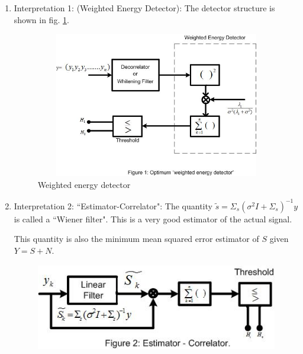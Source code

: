 \documentclass[a4paper,english,12pt]{article}
\begin{document}
\begin{enumerate}
\item Interpretation 1: (Weighted Energy Detector): The detector structure is shown in fig. \ref{fig:detstr1}.
\begin{figure}[!h]
\centering
 \includegraphics[width=5in,height=2.5in]{Figures/figure1}
 \caption{Weighted energy detector}
 \label{fig:detstr1}
\end{figure}
\item Interpretation 2: ``Estimator-Correlator": The quantity $\tilde{s}=\Sigma_s(\sigma^2I + \Sigma_s)^{-1}y$ is called a ``Wiener filter". This is a very good estimator of the actual signal.
 \begin{note}
 This quantity is also the minimum mean squared error estimator of $S$ given $Y=S+N$.
 \end{note}
 \begin{figure}[h]
 \centering
\includegraphics[width=5in,height=1.5in]{Figures/figure2}
 \end{figure}
\end{enumerate}
\end{document}
